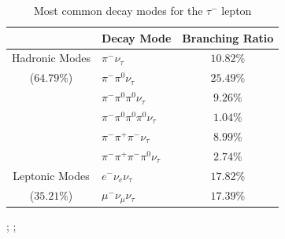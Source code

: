 \begin{table}[h] 

 \parbox{249pt}{
    \begin{minipage}{0.45\textwidth}
        \centering
 \begin{tabular}{|c|l|c|} \toprule
 \hline
       & Decay Mode & Branching Ratio  \\ \hline \hline
    Hadronic Modes  & $\pi^- \nu_\tau$  & $10.82\%$  \\
      	($64.79\%$) & $\pi^- \pi^0 \nu_\tau$ & $25.49\%$ \\
     				& $\pi^- \pi^0 \pi^0 \nu_\tau$  & $9.26\%$  \\
     				& $\pi^- \pi^0 \pi^0 \pi^0 \nu_\tau$  & $1.04\%$   \\
      				& $\pi^- \pi^+ \pi^- \nu_\tau$  & $8.99\%$      \\ \midrule
      				& $\pi^- \pi^+ \pi^- \pi^0 \nu_\tau$  & $2.74\%$  \\ \hline
    			    
    Leptonic Modes  & $e^- \nu_e \nu_\tau$ & $17.82\%$   \\
    	($35.21\%$)	& $\mu^- \nu_\mu \nu_\tau $  & $17.39\%$      \\ \midrule \hline
      				
     				
\end{tabular}
        \caption{\label{tab:taudecay}Most common decay modes for the $\tau^-$ lepton \cite{pdg}}

       
  
    \end{minipage}\hfill

   }
   \parbox{249pt}{

    \begin{minipage}{0.45\textwidth}
        \centering
        ;
    ;
       \label{fig:verts}
    \end{minipage}
}
\end{table}

